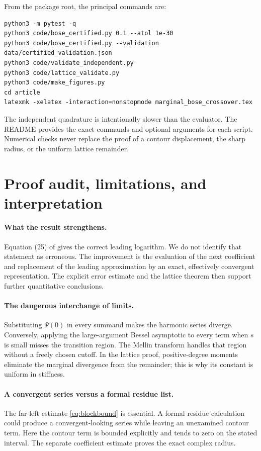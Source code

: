 \documentclass[11pt,a4paper]{article}
\numberwithin{equation}{section}
\theoremstyle{definition}
\begin{document}
From the package root, the principal commands are:
\begin{verbatim}
python3 -m pytest -q
python3 code/bose_certified.py 0.1 --atol 1e-30
python3 code/bose_certified.py --validation data/certified_validation.json
python3 code/validate_independent.py
python3 code/lattice_validate.py
python3 code/make_figures.py
cd article
latexmk -xelatex -interaction=nonstopmode marginal_bose_crossover.tex
\end{verbatim}
The independent quadrature is intentionally slower than the evaluator.
The README provides the exact commands and optional arguments for each
script. Numerical checks never replace the proof of a contour
displacement, the sharp radius, or the uniform lattice remainder.

\section{Proof audit, limitations, and interpretation}
\label{sec:audit}

\paragraph{What the result strengthens.}
Equation (25) of \cite{LJ2020} gives the correct leading logarithm.
We do not identify that statement as erroneous. The improvement is the
evaluation of the next coefficient and replacement of the leading
approximation by an exact, effectively convergent representation. The
explicit error estimate and the lattice theorem then support further
quantitative conclusions.

\paragraph{The dangerous interchange of limits.}
Substituting $\Psi(0)$ in every summand makes the harmonic series diverge.
Conversely, applying the large-argument Bessel asymptotic to every term
when $s$ is small misses the transition region. The Mellin transform
handles that region without a freely chosen cutoff. In the lattice
proof, positive-degree moments eliminate the marginal divergence from
the remainder; this is why its constant is uniform in stiffness.

\paragraph{A convergent series versus a formal residue list.}
The far-left estimate \eqref{eq:blockbound} is essential. A formal
residue calculation could produce a convergent-looking series while
leaving an unexamined contour term. Here the contour term is bounded
explicitly and tends to zero on the stated interval. The separate
coefficient estimate proves the exact complex radius.
\end{document}
